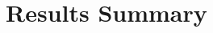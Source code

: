 \documentclass{article}
\begin{document}
\section{Results Summary}

\newpage

\begin{thebibliography}{10}

\end{thebibliography}
\end{document}
